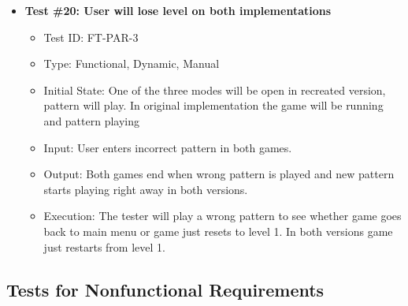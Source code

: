 \documentclass[12pt, titlepage]{article}
\begin{document}
\begin{itemize}
\item \textbf{Test \#20: User will lose level on both implementations }
\begin{itemize}
\item Test ID: FT-PAR-3
\item Type: Functional, Dynamic, Manual 		
\item Initial State: One of the three modes will be open in recreated version, pattern will play. In original implementation the game will be running and pattern playing				
\item Input: User enters incorrect pattern in both games.
\item Output: Both games end when wrong pattern is played and new pattern starts playing right away in both versions.			
\item Execution: The tester will play a wrong pattern to see whether game goes back to main menu or game just resets to level 1. In both versions game just restarts from level 1.
\end{itemize}

\end{itemize}





\subsection{Tests for Nonfunctional Requirements}
\end{document}
